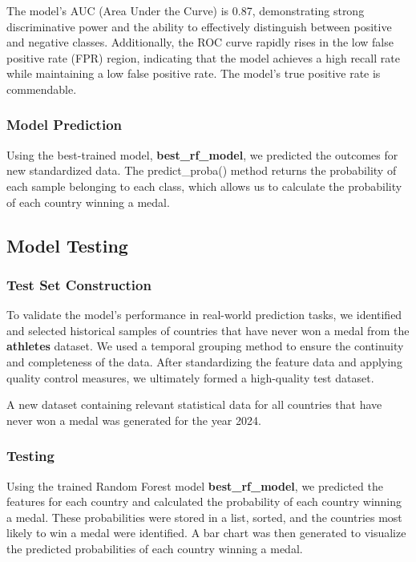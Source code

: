 \documentclass{mcmthesis}
\begin{document}
    The model's AUC (Area Under the Curve) is 0.87, demonstrating strong discriminative power and the ability to effectively distinguish between positive and negative classes. Additionally, the ROC curve rapidly rises in the low false positive rate (FPR) region, indicating that the model achieves a high recall rate while maintaining a low false positive rate. The model's true positive rate is commendable.

\subsubsection{Model Prediction}
    Using the best-trained model, {\bf best\_rf\_model}, we predicted the outcomes for new standardized data. The predict\_proba() method returns the probability of each sample belonging to each class, which allows us to calculate the probability of each country winning a medal.

\subsection{Model Testing}

\subsubsection{Test Set Construction}

    To validate the model's performance in real-world prediction tasks, we identified and selected historical samples of countries that have never won a medal from the {\bf athletes} dataset. We used a temporal grouping method to ensure the continuity and completeness of the data. After standardizing the feature data and applying quality control measures, we ultimately formed a high-quality test dataset.

    A new dataset containing relevant statistical data for all countries that have never won a medal was generated for the year 2024.

\subsubsection{Testing}

    Using the trained Random Forest model {\bf best\_rf\_model}, we predicted the features for each country and calculated the probability of each country winning a medal. These probabilities were stored in a list, sorted, and the countries most likely to win a medal were identified. A bar chart was then generated to visualize the predicted probabilities of each country winning a medal.
\end{document}
